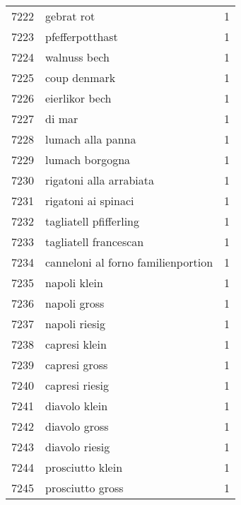 \begin{tabular}{llr}
7222 &                                         gebrat rot &      1 \\
7223 &                                    pfefferpotthast &      1 \\
7224 &                                       walnuss bech &      1 \\
7225 &                                       coup denmark &      1 \\
7226 &                                     eierlikor bech &      1 \\
7227 &                                             di mar &      1 \\
7228 &                                  lumach alla panna &      1 \\
7229 &                                    lumach borgogna &      1 \\
7230 &                            rigatoni alla arrabiata &      1 \\
7231 &                                rigatoni ai spinaci &      1 \\
7232 &                             tagliatell pfifferling &      1 \\
7233 &                              tagliatell francescan &      1 \\
7234 &                 canneloni al forno familienportion &      1 \\
7235 &                                       napoli klein &      1 \\
7236 &                                       napoli gross &      1 \\
7237 &                                      napoli riesig &      1 \\
7238 &                                      capresi klein &      1 \\
7239 &                                      capresi gross &      1 \\
7240 &                                     capresi riesig &      1 \\
7241 &                                      diavolo klein &      1 \\
7242 &                                      diavolo gross &      1 \\
7243 &                                     diavolo riesig &      1 \\
7244 &                                   prosciutto klein &      1 \\
7245 &                                   prosciutto gross &      1 \\

\end{tabular}
